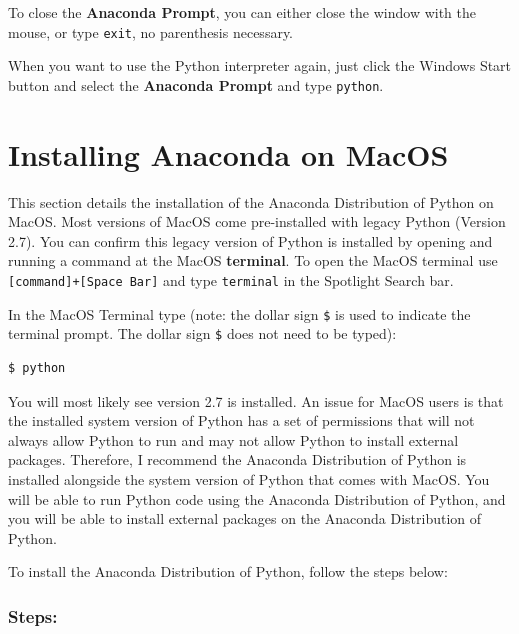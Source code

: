\documentclass{book}
\begin{document}
To close the \textbf{Anaconda Prompt}, you can either close the window
with the mouse, or type \lstinline!exit!, no parenthesis necessary.

When you want to use the Python interpreter again, just click the
Windows Start button and select the \textbf{Anaconda Prompt} and type
\lstinline!python!.
    




    
        \section{Installing Anaconda on
MacOS}\label{installing-anaconda-on-macos}
    




    
        This section details the installation of the Anaconda Distribution of
Python on MacOS. Most versions of MacOS come pre-installed with legacy
Python (Version 2.7). You can confirm this legacy version of Python is
installed by opening and running a command at the MacOS
\textbf{terminal}. To open the MacOS terminal use
\lstinline![command]+[Space Bar]! and type \lstinline!terminal! in the
Spotlight Search bar.

In the MacOS Terminal type (note: the dollar sign \lstinline!$! is used
to indicate the terminal prompt. The dollar sign \lstinline!$! does not
need to be typed):

\begin{lstlisting}
$ python
\end{lstlisting}

You will most likely see version 2.7 is installed. An issue for MacOS
users is that the installed system version of Python has a set of
permissions that will not always allow Python to run and may not allow
Python to install external packages. Therefore, I recommend the Anaconda
Distribution of Python is installed alongside the system version of
Python that comes with MacOS. You will be able to run Python code using
the Anaconda Distribution of Python, and you will be able to install
external packages on the Anaconda Distribution of Python.

To install the Anaconda Distribution of Python, follow the steps below:

\subsubsection{Steps:}\label{steps}
\end{document}
